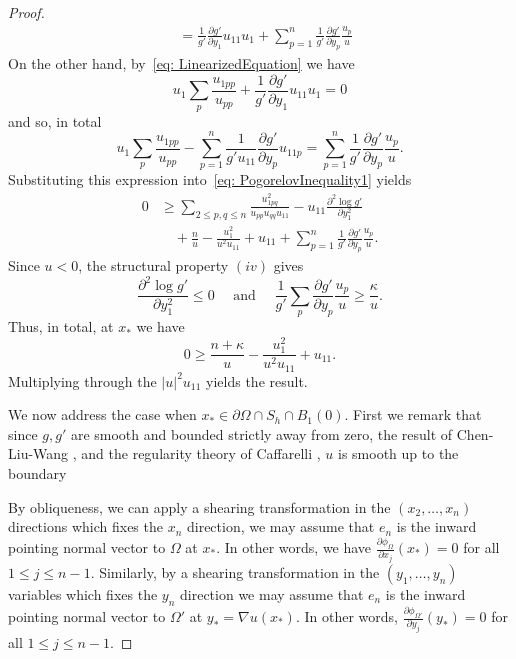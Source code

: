 \documentclass[10pt,a4paper]{amsart}
\newcommand{\del}{\partial}
\numberwithin{equation}{section}
\begin{document}
\begin{proof}
\[\begin{aligned}
&= \frac{1}{g'}\frac{\del g'}{\del y_1}u_{11}u_1 +\sum_{p=1}^{n}\frac{1}{g'}\frac{\del g'}{\del y_p}\frac{u_{p}}{u}
\end{aligned}
\]
On the other hand, by~\eqref{eq: LinearizedEquation} we have
\[
u_1\sum_p \frac{u_{1pp}}{u_{pp}}  + \frac{1}{g'}\frac{\del g'}{\del y_1}u_{11}u_1 = 0
\]
and so, in total
\[
u_1\sum_p \frac{u_{1pp}}{u_{pp}}-\sum_{p=1}^{n}\frac{1}{g'u_{11}}\frac{\del g'}{\del y_p}u_{11p}=\sum_{p=1}^{n}\frac{1}{g'}\frac{\del g'}{\del y_p}\frac{u_{p}}{u}.
\]
Substituting this expression into~\eqref{eq: PogorelovInequality1} yields
\begin{equation}
\begin{aligned}
0 &\geq \sum_{2 \leq p,q\leq n}\frac{u_{1pq}^2} {u_{pp}u_{qq}u_{11}}-u_{11}\frac{\del^2 \log g'}{\del y_1^2}  \\
  &\quad + \frac{n}{u} -\frac{u_1^2}{u^2u_{11}} + u_{11}+\sum_{p=1}^{n}\frac{1}{g'}\frac{\del g'}{\del y_p}\frac{u_{p}}{u}.
  \end{aligned}
\end{equation}
Since $u<0$, the structural property $(iv)$ gives
\[
\frac{\del^2 \log g'}{\del y_1^2} \leq 0 \quad \text{ and } \quad \frac{1}{g'}\sum_p\frac{\del g'}{\del y_p}\frac{u_{p}}{u} \geq \frac{\kappa}{u}.
\]
 Thus, in total, at $x_*$ we have
 \[
 0 \geq \frac{n+\kappa}{u} -\frac{u_1^2}{u^2u_{11}} + u_{11}.
 \]
 Multiplying through the $|u|^2u_{11}$ yields the result.

 We now address the case when $x_* \in \del\Omega \cap S_h \cap B_1(0)$.  First we remark that since $g,g'$ are smooth and bounded strictly away from zero, the result of Chen-Liu-Wang \cite{Chen-Liu-Wang}, and the regularity theory of Caffarelli \cite{Caffarelli2, Caffarelli3}, $u$ is smooth up to the boundary 
 
 By obliqueness, we can apply a shearing transformation in the $(x_2,\ldots,x_{n})$ directions which fixes the $x_n$ direction, we may assume that $e_n$ is the inward pointing normal vector to $\Omega$ at $x_*$.  In other words, we have $\frac{\del \phi_{\Omega}}{\del x_j}(x_*)=0$ for all $1 \leq j \leq n-1$.  Similarly, by a shearing transformation in the $(y_1,\ldots,y_n)$ variables which fixes the $y_n$ direction we may assume that  $e_n$ is the inward pointing normal vector to $\Omega'$ at $y_*=\nabla u(x_*)$.  In other words, $\frac{\del \phi_{\Omega'}}{\del y_j}(y_*)=0$ for all $1 \leq j \leq n-1$. 
 

\end{proof}
\end{document}
